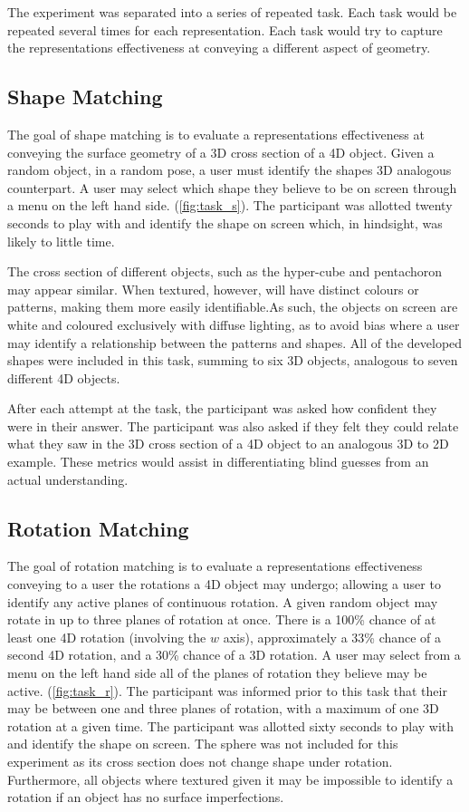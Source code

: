 \documentclass{l4proj}
\begin{document}
The experiment was separated into a series of repeated task. Each task would be repeated several times for each representation. Each task would try to capture the representations effectiveness at conveying a different aspect of geometry.

\subsection*{Shape Matching}

The goal of shape matching is to evaluate a representations effectiveness at conveying the surface geometry of a 3D cross section of a 4D object.
Given a random object, in a random pose, a user must identify the shapes 3D analogous counterpart. A user may select which shape they believe to be on screen through a menu on the left hand side.
(\cref{fig:task_s}).
The participant was allotted twenty seconds to play with and identify the shape on screen which, in hindsight, was likely to little time.

The cross section of different objects, such as the hyper-cube and pentachoron may appear similar. When textured, however, will have distinct colours or patterns, making them more easily identifiable.As such, the objects on screen are white and coloured exclusively with diffuse lighting, as to avoid bias where a user may identify a relationship between the patterns and shapes. 
All of the developed shapes were included in this task, summing to six 3D objects, analogous to seven different 4D objects.

After each attempt at the task, the participant was asked how confident they were in their answer. The participant was also asked if they felt they could relate what they saw in the 3D cross section of a 4D object to an analogous 3D to 2D example. These metrics would assist in differentiating blind guesses from an actual understanding.

\subsection*{Rotation Matching}

The goal of rotation matching is to evaluate a representations effectiveness conveying to a user the rotations a 4D object may undergo; allowing a user to identify any active planes of continuous rotation.
A given random object may rotate in up to three planes of rotation at once. There is a 100\% chance of at least one 4D rotation (involving the \(w\) axis), approximately a 33\% chance of a second 4D rotation, and a 30\% chance of a 3D rotation.
A user may select from a menu on the left hand side all of the planes of rotation they believe may be active. (\cref{fig:task_r}).
The participant was informed prior to this task that their may be between one and three planes of rotation, with a maximum of one 3D rotation at a given time.
The participant was allotted sixty seconds to play with and identify the shape on screen.
The sphere was not included for this experiment as its cross section does not change shape under rotation. 
Furthermore, all objects where textured given it may be impossible to identify a rotation if an object has no surface imperfections.
\end{document}
